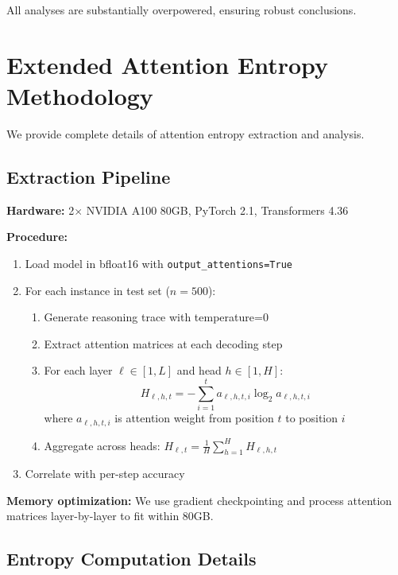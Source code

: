 \documentclass{article}
\theoremstyle{plain}
\theoremstyle{definition}
\theoremstyle{remark}
\begin{document}
All analyses are substantially overpowered, ensuring robust conclusions.


\section{Extended Attention Entropy Methodology}
\label{app:attention_extended}

We provide complete details of attention entropy extraction and analysis.

\subsection{Extraction Pipeline}

\textbf{Hardware:} 2$\times$ NVIDIA A100 80GB, PyTorch 2.1, Transformers 4.36

\textbf{Procedure:}
\begin{enumerate}
\item Load model in bfloat16 with \texttt{output\_attentions=True}
\item For each instance in test set ($n=500$):
\begin{enumerate}
\item Generate reasoning trace with temperature=0
\item Extract attention matrices at each decoding step
\item For each layer $\ell \in [1, L]$ and head $h \in [1, H]$:
\begin{equation}
H_{\ell,h,t} = -\sum_{i=1}^{t} a_{\ell,h,t,i} \log_2 a_{\ell,h,t,i}
\end{equation}
where $a_{\ell,h,t,i}$ is attention weight from position $t$ to position $i$
\item Aggregate across heads: $H_{\ell,t} = \frac{1}{H}\sum_{h=1}^H H_{\ell,h,t}$
\end{enumerate}
\item Correlate with per-step accuracy
\end{enumerate}

\textbf{Memory optimization:} We use gradient checkpointing and process attention matrices layer-by-layer to fit within 80GB.

\subsection{Entropy Computation Details}
\end{document}
